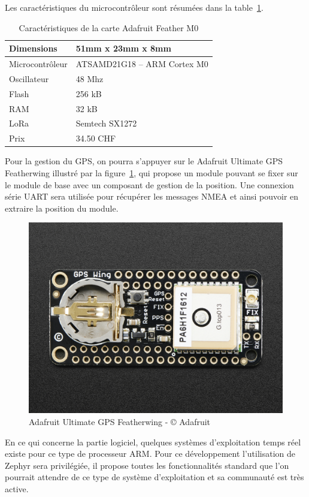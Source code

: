 Les caractéristiques du microcontrôleur sont résumées dans la table~\ref{tab:ada_feather_cara}.

\begin{table}[htb]
\caption[Adafruit Feather Caractéristiques]{Caractéristiques de la carte Adafruit Feather M0}
\label{tab:ada_feather_cara}
\centering
\begin{tabular}{ l | l }
\toprule
Dimensions & 51mm x 23mm x 8mm \\
\midrule
Microcontrôleur & ATSAMD21G18 – ARM Cortex M0 \\
\midrule
Oscillateur & 48 Mhz \\
\midrule
Flash & 256 kB \\
\midrule
RAM & 32 kB \\
\midrule
LoRa & Semtech SX1272 \\
\midrule
Prix & 34.50 CHF\\
\bottomrule 
\end{tabular}
\end{table}

Pour la gestion du GPS, on pourra s’appuyer sur le Adafruit Ultimate GPS Featherwing illustré par la figure~\ref{fig:ada_featherwing_gps}, qui propose un module pouvant se fixer sur le module de base avec un composant de gestion de la position. Une connexion série UART sera utilisée pour récupérer les messages NMEA et ainsi pouvoir en extraire la position du module.

\begin{figure}[htb]
\centering 
\includegraphics[width=0.4\columnwidth]{../images/adafruit-featherwing-ultimate-gps.jpg} 
\caption[Adafruit Featherwing GPS]{Adafruit Ultimate GPS Featherwing - © Adafruit}
\label{fig:ada_featherwing_gps}
\end{figure}

En ce qui concerne la partie logiciel, quelques systèmes d’exploitation temps réel existe pour ce type de processeur ARM. Pour ce développement l’utilisation de Zephyr sera privilégiée, il propose toutes les fonctionnalités standard que l’on pourrait attendre de ce type de système d’exploitation et sa communauté est très active.

